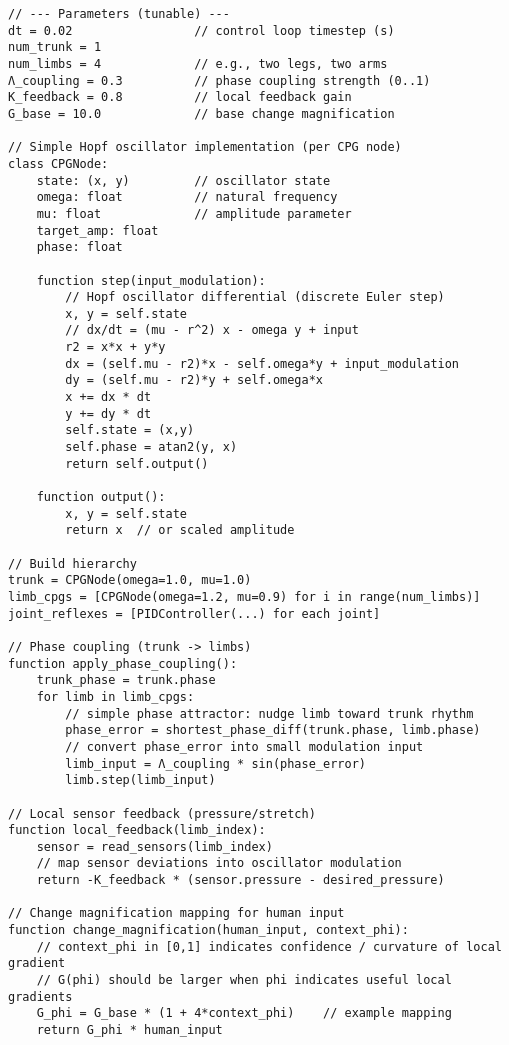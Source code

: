 \documentclass[12pt]{article}
\begin{document}
\begin{verbatim}
// --- Parameters (tunable) ---
dt = 0.02                 // control loop timestep (s)
num_trunk = 1
num_limbs = 4             // e.g., two legs, two arms
Λ_coupling = 0.3          // phase coupling strength (0..1)
K_feedback = 0.8          // local feedback gain
G_base = 10.0             // base change magnification

// Simple Hopf oscillator implementation (per CPG node)
class CPGNode:
    state: (x, y)         // oscillator state
    omega: float          // natural frequency
    mu: float             // amplitude parameter
    target_amp: float
    phase: float

    function step(input_modulation):
        // Hopf oscillator differential (discrete Euler step)
        x, y = self.state
        // dx/dt = (mu - r^2) x - omega y + input
        r2 = x*x + y*y
        dx = (self.mu - r2)*x - self.omega*y + input_modulation
        dy = (self.mu - r2)*y + self.omega*x
        x += dx * dt
        y += dy * dt
        self.state = (x,y)
        self.phase = atan2(y, x)
        return self.output()

    function output():
        x, y = self.state
        return x  // or scaled amplitude

// Build hierarchy
trunk = CPGNode(omega=1.0, mu=1.0)
limb_cpgs = [CPGNode(omega=1.2, mu=0.9) for i in range(num_limbs)]
joint_reflexes = [PIDController(...) for each joint]

// Phase coupling (trunk -> limbs)
function apply_phase_coupling():
    trunk_phase = trunk.phase
    for limb in limb_cpgs:
        // simple phase attractor: nudge limb toward trunk rhythm
        phase_error = shortest_phase_diff(trunk.phase, limb.phase)
        // convert phase_error into small modulation input
        limb_input = Λ_coupling * sin(phase_error)
        limb.step(limb_input)

// Local sensor feedback (pressure/stretch)
function local_feedback(limb_index):
    sensor = read_sensors(limb_index)
    // map sensor deviations into oscillator modulation
    return -K_feedback * (sensor.pressure - desired_pressure)

// Change magnification mapping for human input
function change_magnification(human_input, context_phi):
    // context_phi in [0,1] indicates confidence / curvature of local gradient
    // G(phi) should be larger when phi indicates useful local gradients
    G_phi = G_base * (1 + 4*context_phi)    // example mapping
    return G_phi * human_input


\end{verbatim}
\end{document}
